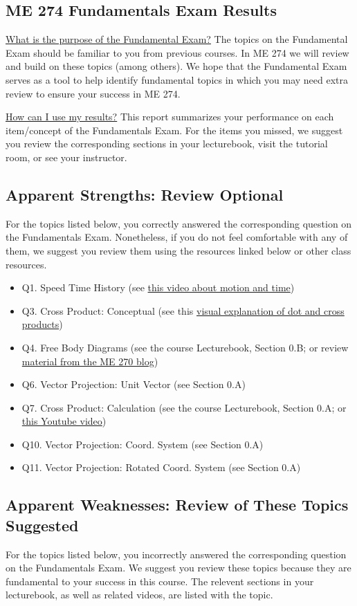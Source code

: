 \documentclass[11pt,letterpaper]{article}\usepackage[]{graphicx}\usepackage[]{color}
\begin{document}
\subsection*{ME 274 Fundamentals Exam Results}
\underline{What is the purpose of the Fundamental Exam?}  The topics on the Fundamental Exam should be familiar to you from previous courses.  In ME 274 we will review and build on these topics (among others). We hope that the Fundamental Exam serves as a tool to help identify fundamental topics in which you may need extra review to ensure your success in ME 274.\

\underline{How can I use my results?}  This report summarizes your performance on each item/concept of the Fundamentals Exam.  For the items you missed, we suggest you review the corresponding sections in your lecturebook, visit the tutorial room, or see your instructor.

\subsection*{Apparent Strengths: Review Optional}
For the topics listed below, you correctly answered the corresponding question on the Fundamentals Exam.  Nonetheless, if you do not feel comfortable with any of them, we suggest you review them using the resources linked below or other class resources.

\begin{itemize}\item Q1. Speed Time History (see \href{https://www.youtube.com/watch?v=lZPtFDXYQRU}{this video about motion and time})
\item Q3. Cross Product: Conceptual (see this \href{https://www.youtube.com/watch?v=h0NJK4mEIJU&t=8s}{visual explanation of dot and cross products})
\item Q4. Free Body Diagrams (see the course Lecturebook, Section 0.B; or review \href{https://www.purdue.edu/statics/}{material from the ME 270 blog})
\item Q6. Vector Projection: Unit Vector (see Section 0.A)
\item Q7. Cross Product: Calculation (see the course Lecturebook, Section 0.A; or \href{https://www.youtube.com/watch?v=DmPxjmymM7k}{this Youtube video})
\item Q10. Vector Projection: Coord. System (see Section 0.A)
\item Q11. Vector Projection: Rotated Coord. System (see Section 0.A)
\end{itemize}\subsection*{Apparent Weaknesses: Review of These Topics Suggested}
For the topics listed below, you incorrectly answered the corresponding question on the Fundamentals Exam.  We suggest you review these topics because they are fundamental to your success in this course.  The relevent sections in your lecturebook, as well as related videos, are listed with the topic.
\end{document}
